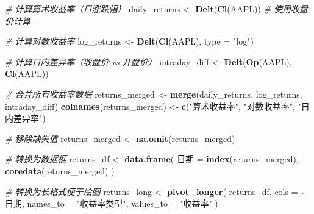 \documentclass[]{ctexbook}
\newenvironment{Shaded}{\begin{snugshade}}{\end{snugshade}}
\newcommand{\AttributeTok}[1]{\textcolor[rgb]{0.13,0.29,0.53}{#1}}
\newcommand{\CommentTok}[1]{\textcolor[rgb]{0.56,0.35,0.01}{\textit{#1}}}
\newcommand{\FunctionTok}[1]{\textcolor[rgb]{0.13,0.29,0.53}{\textbf{#1}}}
\newcommand{\NormalTok}[1]{#1}
\newcommand{\OtherTok}[1]{\textcolor[rgb]{0.56,0.35,0.01}{#1}}
\newcommand{\SpecialCharTok}[1]{\textcolor[rgb]{0.81,0.36,0.00}{\textbf{#1}}}
\newcommand{\StringTok}[1]{\textcolor[rgb]{0.31,0.60,0.02}{#1}}
\begin{document}
\begin{Shaded}
\begin{Highlighting}[]
\CommentTok{\# 计算算术收益率（日涨跌幅）}
\NormalTok{daily\_returns }\OtherTok{\textless{}{-}} \FunctionTok{Delt}\NormalTok{(}\FunctionTok{Cl}\NormalTok{(AAPL))  }\CommentTok{\# 使用收盘价计算}

\CommentTok{\# 计算对数收益率}
\NormalTok{log\_returns }\OtherTok{\textless{}{-}} \FunctionTok{Delt}\NormalTok{(}\FunctionTok{Cl}\NormalTok{(AAPL), }\AttributeTok{type =} \StringTok{"log"}\NormalTok{)}

\CommentTok{\# 计算日内差异率（收盘价 vs 开盘价）}
\NormalTok{intraday\_diff }\OtherTok{\textless{}{-}} \FunctionTok{Delt}\NormalTok{(}\FunctionTok{Op}\NormalTok{(AAPL), }\FunctionTok{Cl}\NormalTok{(AAPL))}

\CommentTok{\# 合并所有收益率数据}
\NormalTok{returns\_merged }\OtherTok{\textless{}{-}} \FunctionTok{merge}\NormalTok{(daily\_returns, log\_returns, intraday\_diff)}
\FunctionTok{colnames}\NormalTok{(returns\_merged) }\OtherTok{\textless{}{-}} \FunctionTok{c}\NormalTok{(}\StringTok{"算术收益率"}\NormalTok{, }\StringTok{"对数收益率"}\NormalTok{, }\StringTok{"日内差异率"}\NormalTok{)}

\CommentTok{\# 移除缺失值}
\NormalTok{returns\_merged }\OtherTok{\textless{}{-}} \FunctionTok{na.omit}\NormalTok{(returns\_merged)}

\CommentTok{\# 转换为数据框}
\NormalTok{returns\_df }\OtherTok{\textless{}{-}} \FunctionTok{data.frame}\NormalTok{(}
\NormalTok{  日期 }\OtherTok{=} \FunctionTok{index}\NormalTok{(returns\_merged),}
  \FunctionTok{coredata}\NormalTok{(returns\_merged)}
\NormalTok{)}

\CommentTok{\# 转换为长格式便于绘图}
\NormalTok{returns\_long }\OtherTok{\textless{}{-}} \FunctionTok{pivot\_longer}\NormalTok{(}
\NormalTok{  returns\_df,}
  \AttributeTok{cols =} \SpecialCharTok{{-}}\NormalTok{日期,}
  \AttributeTok{names\_to =} \StringTok{"收益率类型"}\NormalTok{,}
  \AttributeTok{values\_to =} \StringTok{"收益率"}
\NormalTok{)}
\end{Highlighting}
\end{Shaded}
\end{document}
